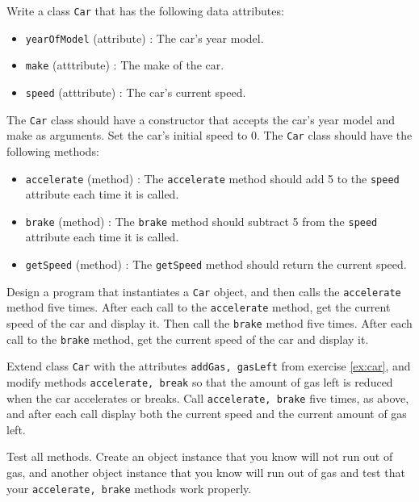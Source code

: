 Write a class \texttt{Car} that has the following data attributes:
  \begin{itemize}
  \item \texttt{yearOfModel} (attribute) : The car's year model.
  \item \texttt{make} (atttribute) : The make of the car.
  \item \texttt{speed} (atttribute) : The car's current speed.
  \end{itemize}
  The \texttt{Car} class should have a constructor that accepts the car's year model and make as arguments. Set the car's initial speed to 0.  The \texttt{Car} class should have the following methods:
  \begin{itemize}
  \item \texttt{accelerate} (method) : The \texttt{accelerate} method should add 5 to the \texttt{speed} attribute each time it is called.
  \item \texttt{brake} (method) : The \texttt{brake} method should subtract 5 from the \texttt{speed} attribute each time it is called.
  \item \texttt{getSpeed} (method) : The \texttt{getSpeed} method should return the current speed.
  \end{itemize}
  Design a program that instantiates a \texttt{Car} object, and then calls the \texttt{accelerate} method five times. After each call to the \texttt{accelerate} method, get the current speed of the car and display it. Then call the \texttt{brake} method five times. After each call to the \texttt{brake} method, get the current speed of the car and display it.
  
  Extend class \texttt{Car} with the attributes \texttt{addGas, gasLeft} from exercise \ref{ex:car}, and modify methods \texttt{accelerate, break} so that the amount of gas left is reduced when the car accelerates or breaks. Call \texttt{accelerate, brake} five times, as above, and after each call display both the current speed and the current amount of gas left.
  
  Test all methods. Create an object instance that you know will not run out of gas, and another object instance that you know will run out of gas and test that your \texttt{accelerate, brake} methods work properly.
  